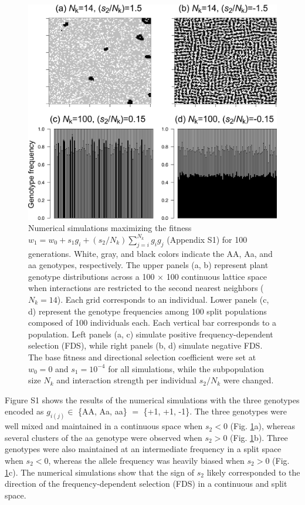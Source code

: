 \documentclass[12pt,]{article}
\begin{document}
\begin{figure}[]
  \includegraphics[width=0.8\linewidth]{FigS1_IsingExample.png}
  \caption{Numerical simulations maximizing the fitness $w_1 = w_0 + s_1g_i + (s_2 / {N_k})\sum^{N_k}_{j=i}{g_ig_j}$ (Appendix S1) for 100 generations. White, gray, and black colors indicate the AA, Aa, and aa genotypes, respectively. The upper panels (a, b) represent plant genotype distributions across a 100 $\times$ 100 continuous lattice space when interactions are restricted to the second nearest neighbors ($N_k=14$). Each grid corresponds to an individual. Lower panels (c, d) represent the genotype frequencies among 100 split populations composed of 100 individuals each. Each vertical bar corresponds to a population. Left panels (a, c) simulate positive frequency-dependent selection (FDS), while right panels (b, d) simulate negative FDS. The base fitness and directional selection coefficient were set at $w_0 = 0$ and $s_1 = 10^{-4}$ for all simulations, while the subpopulation size $N_k$ and interaction strength per individual $s_2/N_k$ were changed.}
  \label{figS1:Ising}
\end{figure}

Figure S1 shows the results of the numerical simulations with the three genotypes encoded as $g_{i(j)} \in$ \{AA, Aa, aa\} $=$ \{+1, +1, -1\}. The three genotypes were well mixed and maintained in a continuous space when $s_2<0$ (Fig. \ref{figS1:Ising}a), whereas several clusters of the aa genotype were observed when $s_2>0$ (Fig. \ref{figS1:Ising}b). Three genotypes were also maintained at an intermediate frequency in a split space when $s_2<0$, whereas the allele frequency was heavily biased when $s_2>0$ (Fig. \ref{figS1:Ising}c). The numerical simulations show that the sign of $s_2$ likely corresponded to the direction of the frequency-dependent selection (FDS) in a continuous and split space.
\end{document}
